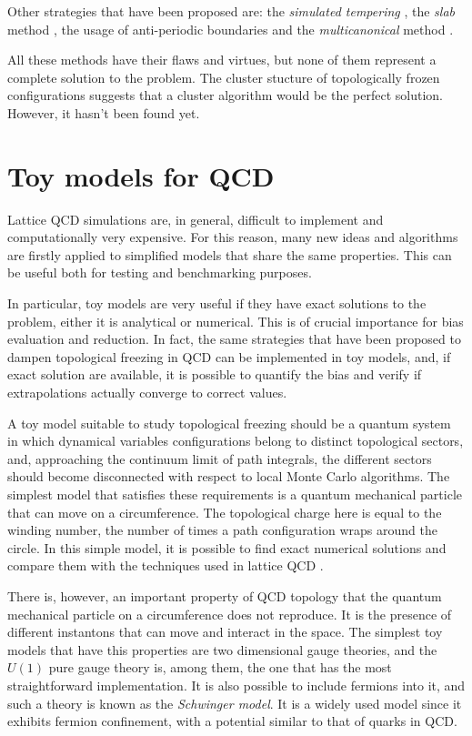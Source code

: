 Other strategies that have been proposed are:
the \emph{simulated tempering} \cite{delia:1996},
the \emph{slab} method \cite{slab-1, slab-2},
the usage of anti-periodic boundaries \cite{mages:2017}
and the \emph{multicanonical} method \cite{todaro:2018}.

All these methods have their flaws and virtues, but none of them represent a complete solution to the problem.
The cluster stucture of topologically frozen configurations suggests that a cluster algorithm would be the perfect solution.
However, it hasn't been found yet.

\section*{Toy models for QCD}
Lattice QCD simulations are, in general, difficult to implement and computationally very expensive.
For this reason, many new ideas and algorithms are firstly applied to simplified models that share the same properties.
This can be useful both for testing and benchmarking purposes.

In particular, toy models are very useful if they have exact solutions to the problem, either it is analytical or numerical.
This is of crucial importance for bias evaluation and reduction.
In fact, the same strategies that have been proposed to dampen topological freezing in QCD can be implemented in toy models, and,
if exact solution are available, it is possible to quantify the bias and verify if extrapolations actually converge to correct values.

A toy model suitable to study topological freezing should be a quantum system in which dynamical variables configurations belong to distinct topological sectors,
and, approaching the continuum limit of path integrals, the different sectors should become disconnected with respect to local Monte Carlo algorithms.
The simplest model that satisfies these requirements is a quantum mechanical particle that can move on a circumference.
The topological charge here is equal to the winding number, \ie the number of times a path configuration wraps around the circle.
In this simple model, it is possible to find exact numerical solutions and compare them with the techniques used in lattice QCD \cite{dromard-wagner:2014, bonati-delia:2018}.

There is, however, an important property of QCD topology that the quantum mechanical particle on a circumference does not reproduce.
It is the presence of different instantons that can move and interact in the space.
The simplest toy models that have this properties are two dimensional gauge theories,
and the $U(1)$ pure gauge theory is, among them, the one that has the most straightforward implementation.
It is also possible to include fermions into it, and such a theory is known as the \emph{Schwinger model}.
It is a widely used model since it exhibits fermion confinement, with a potential similar to that of quarks in QCD.


